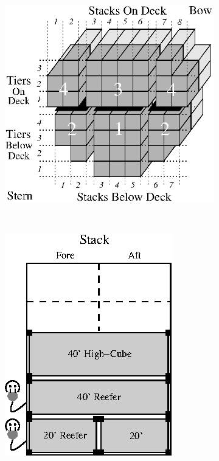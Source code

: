 \documentclass[preprint,12pt,3p]{elsarticle}
\begin{document}
\begin{figure}[ht]
    \centering
    \begin{subfigure}[b]{0.35\textwidth}
        \includegraphics[width=\textwidth]{Figures/bay.eps}
        \caption{}
        \label{fig:bay}
    \end{subfigure}
    ~
    \begin{subfigure}[b]{0.28\textwidth}
        \includegraphics[width=\textwidth]{Figures/stack.eps}

\end{subfigure}
\end{figure}
\end{document}
